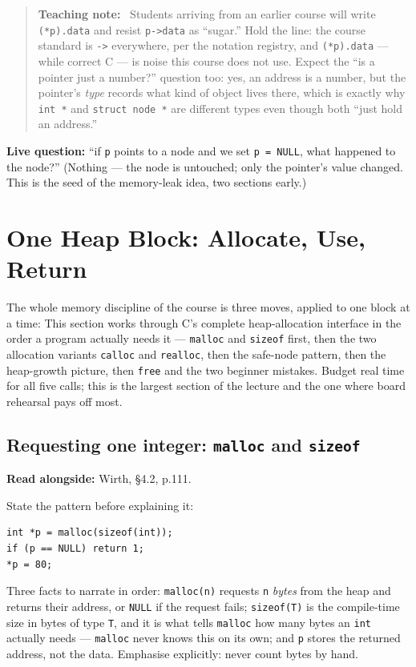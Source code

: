 \documentclass[11pt]{article}
\newenvironment{teachingaside}{\begin{quote}\small\color{primary-gold}\textbf{Teaching note:}\ }{\end{quote}}
\begin{document}
\begin{teachingaside}
Students arriving from an earlier course will write \texttt{(*p).data} and resist \texttt{p->data} as ``sugar.'' Hold the line: the course standard is \texttt{->} everywhere, per the notation registry, and \texttt{(*p).data} --- while correct C --- is noise this course does not use. Expect the ``is a pointer just a number?'' question too: yes, an address is a number, but the pointer's \emph{type} records what kind of object lives there, which is exactly why \texttt{int *} and \texttt{struct node *} are different types even though both ``just hold an address.''
\end{teachingaside}

\textbf{Live question:} ``if \texttt{p} points to a node and we set \texttt{p = NULL}, what happened to the node?'' (Nothing --- the node is untouched; only the pointer's value changed. This is the seed of the memory-leak idea, two sections early.)

\section{One Heap Block: Allocate, Use, Return}
\label{sec:heap}

The whole memory discipline of the course is three moves, applied to one block at a time:  This section works through C's complete heap-allocation interface in the order a program actually needs it --- \texttt{malloc} and \texttt{sizeof} first, then the two allocation variants \texttt{calloc} and \texttt{realloc}, then the safe-node pattern, then the heap-growth picture, then \texttt{free} and the two beginner mistakes. Budget real time for all five calls; this is the largest section of the lecture and the one where board rehearsal pays off most.

\subsection{Requesting one integer: \texttt{malloc} and \texttt{sizeof}}
\label{sec:heap-detail}

\textbf{Read alongside:} Wirth, \S4.2, p.111.

State the pattern before explaining it:
\begin{verbatim}
int *p = malloc(sizeof(int));
if (p == NULL) return 1;
*p = 80;
\end{verbatim}
Three facts to narrate in order: \texttt{malloc(n)} requests \texttt{n} \emph{bytes} from the heap and returns their address, or \texttt{NULL} if the request fails; \texttt{sizeof(T)} is the compile-time size in bytes of type \texttt{T}, and it is what tells \texttt{malloc} how many bytes an \texttt{int} actually needs --- \texttt{malloc} never knows this on its own; and \texttt{p} stores the returned address, not the data. Emphasise explicitly: never count bytes by hand.
\end{document}
